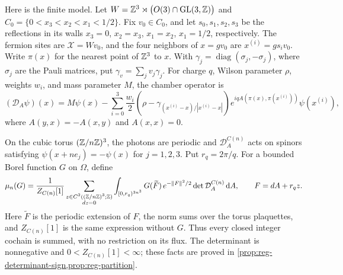 Here is the finite model. Let
$W=\mathbb Z^3\rtimes\bigl(O(3)\cap\operatorname{GL}(3,\mathbb Z)\bigr)$ and
$C_0=\{0<x_3<x_2<x_1<1/2\}$. Fix $v_0\in C_0$, and let
$s_0,s_1,s_2,s_3$ be the reflections in its walls
$x_3=0$, $x_2=x_3$, $x_1=x_2$, $x_1=1/2$, respectively.
The fermion sites are $\mathcal X=Wv_0$, and the four neighbors
of $x=gv_0$ are $x^{(i)}=gs_iv_0$. Write $\pi(x)$ for the nearest
point of $\mathbb Z^3$ to $x$. With $\gamma_j=\operatorname{diag}(\sigma_j,-\sigma_j)$,
where $\sigma_j$ are the Pauli matrices, put $\gamma_v=\sum_jv_j\gamma_j$.
For charge $q$, Wilson parameter $\rho$, weights $w_i$, and mass
parameter $M$, the chamber operator is
\[
 (\mathcal D_A\psi)(x)
 =M\psi(x)-\sum_{i=0}^3\frac{w_i}{2}
   \left(\rho-\gamma_{(x^{(i)}-x)/|x^{(i)}-x|}\right)
   e^{iqA(\pi(x),\pi(x^{(i)}))}\psi(x^{(i)}),
\]
where $A(y,x)=-A(x,y)$ and $A(x,x)=0$.

On the cubic torus $(\mathbb Z/n\mathbb Z)^3$, the photons are periodic and
$\mathcal D_A^{C(n)}$ acts on spinors satisfying
$\psi(x+ne_j)=-\psi(x)$ for $j=1,2,3$. Put $r_q=2\pi/q$.
For a bounded Borel function $G$ on $\Omega$, define
\[
 \mu_n(G)=\frac1{Z_{C(n)}[1]}
 \sum_{\substack{z\in C^2((\mathbb Z/n\mathbb Z)^3;\mathbb Z)\\dz=0}}
 \int_{[0,r_q)^{3n^3}}
 G(\widetilde F)\,e^{-\|F\|^2/2}
       \det\mathcal D_A^{C(n)}\,\mathrm d A,
 \qquad F=dA+r_qz.
\]
Here $\widetilde F$ is the periodic extension of $F$, the norm sums
over the torus plaquettes, and $Z_{C(n)}[1]$ is the same expression
without $G$. Thus every closed integer cochain is summed, with no
restriction on its flux. The determinant is nonnegative and
$0<Z_{C(n)}[1]<\infty$; these facts are proved in
\cref{prop:reg-determinant-sign,prop:reg-partition}.

